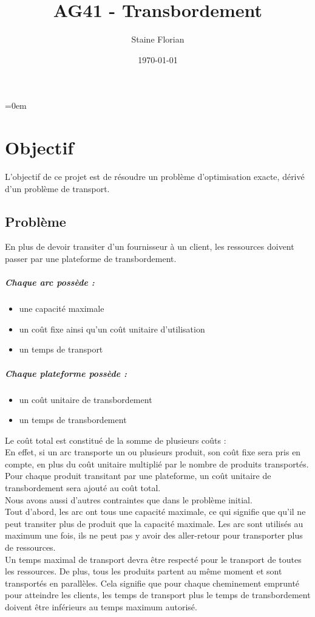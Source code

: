 \documentclass[a4paper, 12pt]{report}
\title{AG41 - Transbordement}
\author{Staine Florian}
\date\today
\begin{document}
\maketitle
\parindent=0em

\chapter{Objectif}
L'objectif de ce projet est de résoudre un problème d'optimisation exacte, 
dérivé d'un problème de transport. 
\section{Problème}
En plus de devoir transiter d'un fournisseur à un client, 
les ressources doivent passer par une plateforme de transbordement.

\paragraph{Chaque arc possède : }
\begin{itemize}
 \item une capacité maximale
 \item un coût fixe ainsi qu'un coût unitaire d'utilisation
 \item un temps de transport
\end{itemize}

\paragraph{Chaque plateforme possède : }
\begin{itemize}
 \item un coût unitaire de transbordement
 \item un temps de transbordement
\end{itemize}

Le coût total est constitué de la somme de plusieurs coûts :\\
En effet, si un arc transporte un ou plusieurs produit, son coût fixe sera pris en compte, 
en plus du coût unitaire multiplié par le nombre de produits transportés.
Pour chaque produit transitant par une plateforme, un coût unitaire de transbordement sera ajouté au coût total.\\

Nous avons aussi d'autres contraintes que dans le problème initial.\\
Tout d'abord, les arc ont tous une capacité maximale, ce qui signifie que 
qu'il ne peut transiter plus de produit que la capacité maximale. 
Les arc sont utilisés au maximum une fois, ils ne peut pas y avoir des aller-retour 
pour transporter plus de ressources.\\
Un temps maximal de transport devra être respecté pour le transport de toutes les ressources.
De plus, tous les produits partent au même moment et sont transportés en parallèles. 
Cela signifie que pour chaque cheminement emprunté pour atteindre les clients,
les temps de transport plus le temps de transbordement doivent être inférieurs au temps maximum autorisé.
\end{document}
